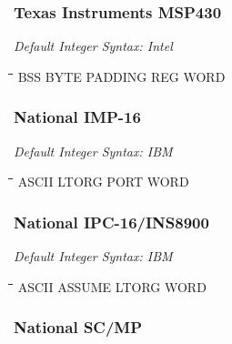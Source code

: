 \subsubsection{Texas Instruments MSP430}

{\em Default Integer Syntax: Intel}

{\tt\begin{tabbing}
\hspace{3cm}\=\hspace{3cm}\=\hspace{3cm}\=\hspace{3cm}\=\kill
BSS        \> BYTE        \> PADDING     \> REG         \> WORD \\
\end{tabbing}}

\subsubsection{National IMP-16}

{\em Default Integer Syntax: IBM}

{\tt\begin{tabbing}
\hspace{3cm}\=\hspace{3cm}\=\hspace{3cm}\=\hspace{3cm}\=\kill
ASCII      \> LTORG       \> PORT        \> WORD \\
\end{tabbing}}

\subsubsection{National IPC-16/INS8900}

{\em Default Integer Syntax: IBM}

{\tt\begin{tabbing}
\hspace{3cm}\=\hspace{3cm}\=\hspace{3cm}\=\hspace{3cm}\=\kill
ASCII      \> ASSUME      \> LTORG       \> WORD \\
\end{tabbing}}

\subsubsection{National SC/MP}

